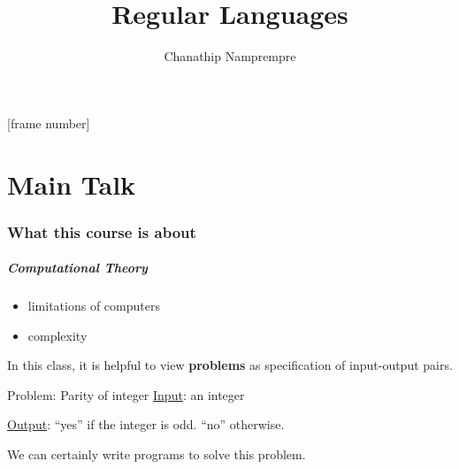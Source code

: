 \documentclass[xcolor=table]{beamer}
\title{Regular Languages}
\author{Chanathip Namprempre}
\institute{
  Computer Science \\
  Reed College}
\date{}
\begin{document}


\frame{\titlepage}





[frame number]

\part<presentation>{Main Talk}

\section[Theme]{What this course is about}

\begin{frame}
  \frametitle{Computational Theory}

  \begin{itemize}
    \item limitations of computers
    \item complexity
  \end{itemize}

\end{frame}

\begin{frame}

  In this class, it is helpful to view \alert{\textbf{problems}} as
  specification of input-output pairs.

  \begin{block}{Problem: Parity of integer}
  \hspace{14pt}\underline{Input}: an integer

  \hspace{14pt}\underline{Output}: ``yes'' if the integer is odd. ``no'' otherwise.
  \end{block}

  \bigskip
  We can certainly write programs to solve this problem.

\end{frame}
\end{document}
